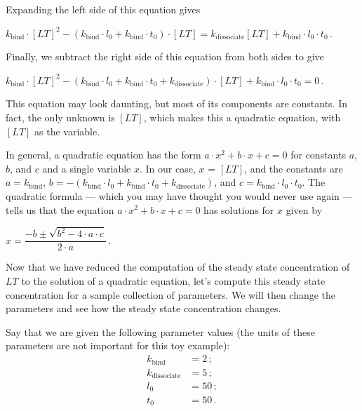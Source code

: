 \noindent Expanding the left side of this equation gives

\begin{center}
$k_\text{bind} \cdot [LT]^2 - (k_\text{bind} \cdot l_0 + k_\text{bind} \cdot t_0) \cdot [LT]  = k_\text{dissociate} [LT] + k_\text{bind} \cdot l_0 \cdot t_0$\,.
\end{center}

\noindent Finally, we subtract the right side of this equation from both sides to give

\begin{center}
$k_\text{bind} \cdot [LT]^2 - (k_\text{bind} \cdot l_0 + k_\text{bind} \cdot t_0 + k_\text{dissociate}) \cdot [LT] + k_\text{bind} \cdot l_0 \cdot t_0 = 0$\,.
\end{center}

\noindent This equation may look daunting, but most of its components are constants. In fact, the only unknown is $[LT]$, which makes this a quadratic equation, with $[LT]$ as the variable.

In general, a quadratic equation has the form $a \cdot x^2 + b \cdot x + c = 0$ for constants $a$, $b$, and $c$ and a single variable $x$. In our case, $x$ = $[LT]$, and the constants are $a = k_\text{bind}$, $b = - (k_\text{bind} \cdot l_0 + k_\text{bind} \cdot t_0 + k_\text{dissociate})$, and $c = k_\text{bind} \cdot l_0 \cdot t_0$. The quadratic formula --- which you may have thought you would never use again --- tells us that the equation $a \cdot x^2 + b \cdot x + c = 0$  has solutions for $x$ given by

\begin{center}
$x = \dfrac{-b \pm \sqrt{b^2 - 4 \cdot a \cdot c}}{2 \cdot a}$\,.
\end{center}

\fudgespace

\begin{qbox}\end{qbox}

Now that we have reduced the computation of the steady state concentration of $LT$ to the solution of a quadratic equation, let's compute this steady state concentration for a sample collection of parameters. We will then change the parameters and see how the steady state concentration changes.

Say that we are given the following parameter values (the units of these parameters are not important for this toy example):
\begin{align*}
k_\text{bind} & = 2\,;\\
k_\text{dissociate} & = 5\,;\\
l_0 & = 50\,;\\
t_0 & = 50\,.
\end{align*}

